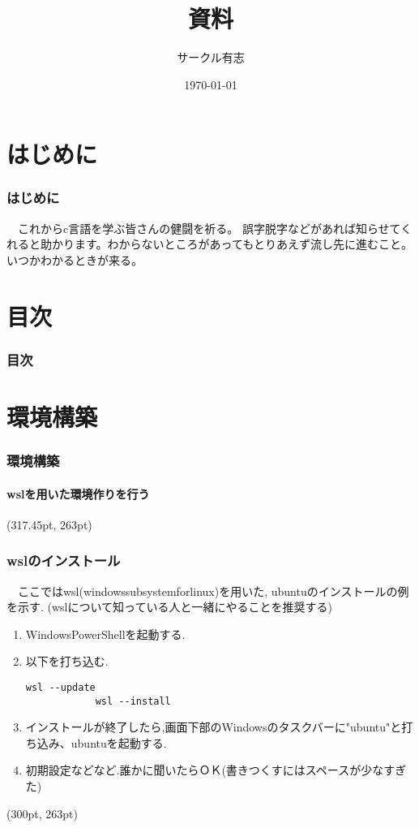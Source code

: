 \documentclass[dvipdfmx]{beamer}
\title{資料}
\author{サークル有志}
\date{\today}
\begin{document}
\begin{frame}[plain, label=1]
    \frametitle{}
    \titlepage
\end{frame}

\section{はじめに}
\begin{frame}[c, label=2]
    \frametitle{はじめに}
    　これからc言語を学ぶ皆さんの健闘を祈る。
    誤字脱字などがあれば知らせてくれると助かります。わからないところがあってもとりあえず流し先に進むこと。いつかわかるときが来る。
\end{frame}

\section{目次}
\begin{frame}[allowframebreaks]
    \frametitle{目次}
    \tableofcontents
\end{frame}

\section{環境構築}
\begin{frame}[label=4]
    \frametitle{環境構築}
    \framesubtitle{wslを用いた環境作りを行う}
    \tableofcontents[sections={2,3}]
    \begin{textblock*}{0.3\linewidth}(317.45pt, 263pt)
        \hyperlink{5}{}
    \end{textblock*}
\end{frame}

\begin{frame}[t, fragile, label=5]
    \frametitle{wslのインストール}
    　ここではwsl(windows\space subsystem\space for\space linux)を用いた,
    ubuntuのインストールの例を示す.
    (wslについて知っている人と一緒にやることを推奨する)
    \begin{enumerate}
        \item Windows\space PowerShellを起動する.
        \item 以下を打ち込む.
        \begin{lstlisting}[gobble=9, caption=Windows\space PowerShell]
            wsl --update
            wsl --install
        \end{lstlisting}
        \item インストールが終了したら,画面下部のWindowsのタスクバーに"ubuntu"と打ち込み、ubuntuを起動する.
        \item 初期設定などなど.誰かに聞いたらＯＫ(書きつくすにはスペースが少なすぎた)
    \end{enumerate}
    \begin{textblock*}{0.3\linewidth}(300pt, 263pt)
        \hyperlink{4}{}
        \space
        \hyperlink{6}{}
    \end{textblock*}
\end{frame}
\end{document}
